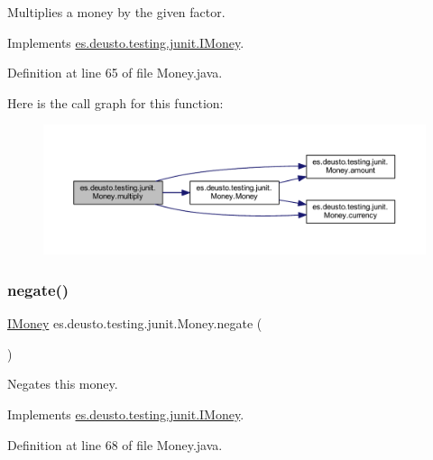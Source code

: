 Multiplies a money by the given factor. 

Implements \mbox{\hyperlink{interfacees_1_1deusto_1_1testing_1_1junit_1_1_i_money_a09154f9713133d4734f72d6a20081209}{es.\+deusto.\+testing.\+junit.\+I\+Money}}.



Definition at line 65 of file Money.\+java.

Here is the call graph for this function\+:
\nopagebreak
\begin{figure}[H]
\begin{center}
\leavevmode
\includegraphics[width=350pt]{classes_1_1deusto_1_1testing_1_1junit_1_1_money_a02c7d4e9013710f70d1d46e9c9ebae88_cgraph}
\end{center}
\end{figure}
\mbox{\label{classes_1_1deusto_1_1testing_1_1junit_1_1_money_ae5f0bc3ea87f1fd55d6478653b8f2e36}} 
\subsubsection{\texorpdfstring{negate()}{negate()}}
{\footnotesize\ttfamily \mbox{\hyperlink{interfacees_1_1deusto_1_1testing_1_1junit_1_1_i_money}{I\+Money}} es.\+deusto.\+testing.\+junit.\+Money.\+negate (\begin{DoxyParamCaption}{ }\end{DoxyParamCaption})}

Negates this money. 

Implements \mbox{\hyperlink{interfacees_1_1deusto_1_1testing_1_1junit_1_1_i_money_a741967d7aa89055b6873619303b11385}{es.\+deusto.\+testing.\+junit.\+I\+Money}}.



Definition at line 68 of file Money.\+java.

